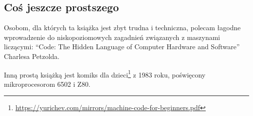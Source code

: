 

\subsection{Coś jeszcze prostszego}

Osobom, dla których ta książka jest zbyt trudna i techniczna,
polecam łagodne wprowadzenie do niskopoziomowych zagadnień związanych z maszynami liczącymi:
``Code: The Hidden Language of Computer Hardware and Software'' Charlesa Petzolda.

Inną prostą książką jest komiks dla dzieci\footnote{\url{https://yurichev.com/mirrors/machine-code-for-beginners.pdf}} z 1983 roku,
poświęcony mikroprocesorom 6502 i Z80.

